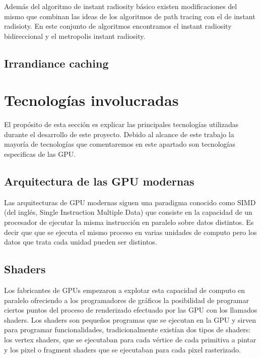 \medskip

Además del algoritmo de instant radiosity básico existen modificaciones del mismo que combinan las ideas de los algoritmos de path tracing con el de instant radisioty. En este conjunto de algoritmos encontramos el instant radiosity bidireccional y el metropolis instant radiosity.  

\subsection{Irrandiance caching}

\clearpage

\section{Tecnologías involucradas}

El propósito de esta sección es explicar las principales tecnologías utilizadas durante el desarrollo de este proyecto. Debido al alcance de este trabajo la mayoría de tecnologías que comentaremos en este apartado son tecnologías especificas de las GPU.

\subsection{Arquitectura de las GPU modernas}

Las arquitecturas de GPU modernas siguen una paradigma conocido como SIMD (del inglés, Single Instruction Multiple Data) que consiste en la capacidad de un procesador de ejecutar la misma instrucción en paralelo sobre datos distintos. Es decir que que se ejecuta el mismo proceso en varias unidades de computo pero los datos que trata cada unidad pueden ser distintos.

\subsection{Shaders}

Los fabricantes de GPUs empezaron a explotar esta capacidad de computo en paralelo ofreciendo a los programadores de gráficos la posibilidad de programar ciertos puntos del proceso de renderizado efectuado por las GPU con los llamados shaders. Los shaders son pequeños programas que se ejecutan en la GPU y sirven para programar funcionalidades, tradicionalmente existían dos tipos de shaders: los vertex shaders, que se ejecutaban para cada vértice de cada primitiva a pintar y los pixel o fragment shaders que se ejecutaban para cada pixel rasterizado.

